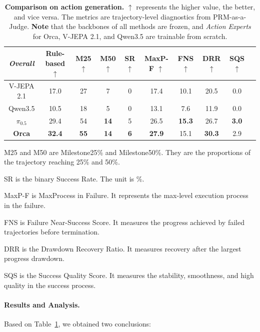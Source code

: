 \documentclass{llmxive}
\begin{document}
\begin{table}[t]
\begin{threeparttable}
\begin{tabular}{c|c|cccccccc}
    \multicolumn{1}{c}{\textbf{\textit{Overall}}} &  Rule-based $\uparrow$   & M25 $\uparrow$ & M50 $\uparrow$ & SR $\uparrow$ & MaxP-F $\uparrow$ & FNS $\uparrow$ & DRR $\uparrow$  & SQS $\uparrow$ \\
    \midrule[0.5pt]
    V-JEPA 2.1 & 17.0  & 27    & 7     & 0     & 17.4  & 10.1    & 20.5  & 0.0 \\
    Qwen3.5 & 10.5  & 18    & 5     & 0     & 13.1  & 7.6     & 11.9  & 0.0 \\
    $\pi_{0.5}$  & 29.4  & 54    & \textbf{14} & 5     & 26.5  & \textbf{15.3}   & 26.7  & \textbf{3.0} \\
    \rowcolor[rgb]{ .89,  .949,  .851}\textbf{Orca} & \textbf{32.4} & \textbf{55} & \textbf{14}    & \textbf{6} & \textbf{27.9} & 15.1 & \textbf{30.3} & 2.9 \\
    \bottomrule[1pt]
    \end{tabular}%
    \begin{tablenotes}
        \footnotesize
        \item[1] M25 and M50 are Milestone25\% and Milestone50\%. They are the proportions of the trajectory reaching 25\% and 50\%.
        \item[2] SR is the binary Success Rate. The unit is \%.
        \item[3] MaxP-F is MaxProcess in Failure. It represents the max-level execution process in the failure.
        \item[4] FNS is Failure Near-Success Score. It measures the progress achieved by failed trajectories before termination.
        \item[5] DRR is the Drawdown Recovery Ratio. It measures recovery after the largest progress drawdown.
        \item[6] SQS is the Success Quality Score. It measures the stability, smoothness, and high quality in the success process.
    \end{tablenotes}
  \end{threeparttable}
\caption{\textbf{Comparison on action generation.} $\uparrow$ represents the higher value, the better, and vice versa.
  The metrics are trajectory-level diagnostics from PRM-as-a-Judge. \textbf{Note} that the backbones of all methods are frozen, and \textit{Action Experts} for Orca, V-JEPA 2.1, and Qwen3.5 are trainable from scratch.}
\label{tab:comparison_changing_world}
\end{table}%


\paragraph{Results and Analysis.} 
Based on Table~\ref{tab:comparison_changing_world}, we obtained two conclusions:
\end{document}
